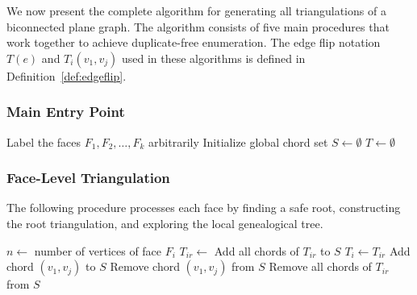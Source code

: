 \documentclass[12pt,a4paper]{article}
\theoremstyle{definition}
\theoremstyle{remark}
\begin{document}
We now present the complete algorithm for generating all triangulations of a biconnected plane graph. The algorithm consists of five main procedures that work together to achieve duplicate-free enumeration. The edge flip notation $T(e)$ and $T_i(v_1, v_j)$ used in these algorithms is defined in Definition~\ref{def:edgeflip}.


\subsubsection{Main Entry Point}

\begin{algorithm}
\caption{Start Triangulation Process}
\label{alg:start}
\begin{algorithmic}[1]
    \State Label the faces $F_1, F_2, \ldots, F_k$ arbitrarily
    \State Initialize global chord set $S \gets \emptyset$
    \State $T \gets \emptyset$ 
    \State {}
\EndProcedure
\end{algorithmic}
\end{algorithm}


\subsubsection{Face-Level Triangulation}

The following procedure processes each face by finding a safe root, constructing the root triangulation, and exploring the local genealogical tree.

\begin{algorithm}
\caption{Find All Triangulations for Current Face}
\label{alg:face_triangulation}
\begin{algorithmic}[1]
    \State $n \gets$ number of vertices of face $F_i$
    \State $T_{ir} \gets$  
    \State Add all chords of $T_{ir}$ to $S$ 
    \State {}
    \State $T_i \gets T_{ir}$
        \State Add chord $(v_1, v_j)$ to $S$
        \State {}
        \State Remove chord $(v_1, v_j)$ from $S$
    \EndFor
    \State Remove all chords of $T_{ir}$ from $S$ 
\EndProcedure
\end{algorithmic}
\end{algorithm}
\end{document}
